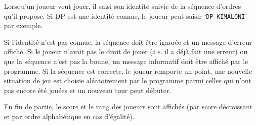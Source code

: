\documentclass[10pt,a4paper,oneside]{article}
\begin{document}
Lorsqu'un joueur veut jouer, il saisi son identité suivie de la séquence d'ordres qu'il propose. Si DP est une identité connue, le joueur peut saisir `\texttt{DP KIMALONI}' par exemple. 

Si l'identité n'est pas connue, la séquence doit être ignorée et un message d'erreur affiché. Si le joueur n'avait pas le droit de jouer (\textit{i.e.} il a déjà fait une erreur) ou que la séquence n'est pas la bonne, un message informatif doit être affiché par le programme. Si la séquence est correcte, le joueur remporte un point, une nouvelle situation de jeu est choisie aléatoirement par le programme parmi celles qui n'ont pas encore été jouées et un nouveau tour peut débuter.

En fin de partie, le score et le rang des joueurs sont affichés (par score décroissant et par ordre alphabétique en cas d'égalité).
\end{document}
